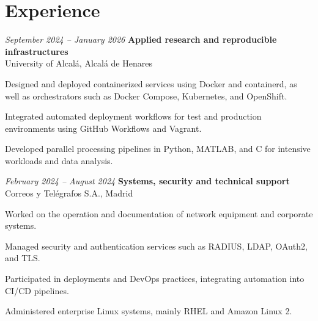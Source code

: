 \vspace{-7pt}

\section{Experience}

\begin{twocolentry}{\textit{September 2024 – January 2026}}
	\textbf{Applied research and reproducible infrastructures} \\
	University of Alcalá, Alcalá de Henares
\end{twocolentry}
\begin{onecolentry}
	\begin{highlights}
		\item Designed and deployed containerized services using Docker and containerd, as well as orchestrators such as Docker Compose, Kubernetes, and OpenShift.
		\item Integrated automated deployment workflows for test and production environments using GitHub Workflows and Vagrant.
		\item Developed parallel processing pipelines in Python, MATLAB, and C for intensive workloads and data analysis.
	\end{highlights}
\end{onecolentry}

\vspace{0.2 cm}

\begin{twocolentry}{\textit{February 2024 – August 2024}}
	\textbf{Systems, security and technical support} \\
	Correos y Telégrafos S.A., Madrid
\end{twocolentry}
\begin{onecolentry}
	\begin{highlights}
		\item Worked on the operation and documentation of network equipment and corporate systems.
		\item Managed security and authentication services such as RADIUS, LDAP, OAuth2, and TLS.
		\item Participated in deployments and DevOps practices, integrating automation into CI/CD pipelines.
		\item Administered enterprise Linux systems, mainly RHEL and Amazon Linux 2.
	\end{highlights}
\end{onecolentry}

